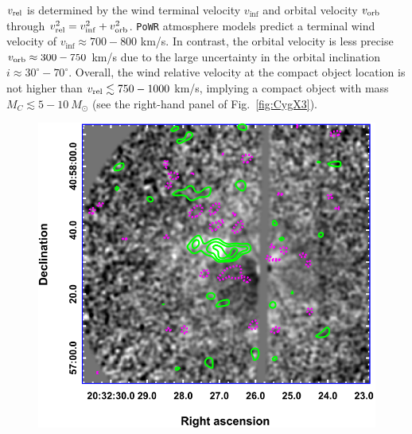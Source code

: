 \documentclass[a4paper,titlepage]{book}     	%
\newcommand{\sun}{\ensuremath{_\odot}}
\newcommand{\msun}{\ensuremath{M\sun}}
\begin{document}
$v_{\rm rel}$ is determined by the wind terminal velocity $v_{\inf}$ and orbital velocity $v_{\rm  orb}$ through $v_{\rm rel}^2 = v_{\inf}^2 + v_{\rm orb}^2$. \texttt{PoWR} atmosphere models predict a terminal wind velocity of $v_{\inf} \approx 700-800$ km/s. In contrast, the orbital velocity is less precise $v_{\rm orb} \approx 300-750$ km/s due to the large uncertainty in the orbital inclination $i \approx 30^{\circ}-70^{\circ}$. Overall, the wind relative velocity at the compact object location is not higher than $v_{\rm rel} \lesssim 750-1000$ km/s, implying a compact object with mass $M_C \lesssim 5-10~\msun$ (see the right-hand panel of Fig.\ \ref{fig:CygX3}). 


\begin{figure}[t!]
	\begin{minipage}{.49\textwidth}
		\centering
		\includegraphics[width=\textwidth]{./images/CygX3littlefriend.png}
	\end{minipage}
	\hfill
	\begin{minipage}{.49\textwidth}
		\centering

\end{minipage}
\end{figure}
\end{document}
